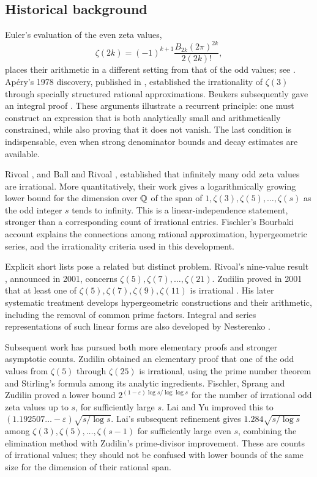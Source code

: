 \subsection{Historical background}
Euler's evaluation of the even zeta values,
\[
 \zeta(2k)=(-1)^{k+1}\frac{B_{2k}(2\pi)^{2k}}{2(2k)!},
\]
places their arithmetic in a different setting from that of the odd values;
see \cite[\S25.6]{DLMF}. Ap\'ery's 1978 discovery, published in
\cite{Apery}, established the irrationality of $\zeta(3)$ through specially
structured rational approximations. Beukers subsequently gave an integral
proof \cite{Beukers}. These arguments illustrate a recurrent principle:
one must construct an expression that is both analytically small and
arithmetically constrained, while also proving that it does not vanish.
The last condition is indispensable, even when strong denominator bounds
and decay estimates are available.

Rivoal \cite{Rivoal00}, and Ball and Rivoal \cite{BR}, established that
infinitely many odd zeta values are irrational. More quantitatively, their
work gives a logarithmically growing lower bound for the dimension over
$\mathbb Q$ of the span of $1,\zeta(3),\zeta(5),\ldots,\zeta(s)$ as the odd
integer $s$ tends to infinity. This is a linear-independence statement,
stronger than a corresponding count of irrational entries. Fischler's
Bourbaki account \cite{Fischler04} explains the connections among rational
approximation, hypergeometric series, and the irrationality criteria used
in this development.

Explicit short lists pose a related but distinct problem. Rivoal's
nine-value result \cite{Rivoal02}, announced in 2001, concerns
$\zeta(5),\zeta(7),\ldots,\zeta(21)$. Zudilin proved in 2001 that at least
one of $\zeta(5),\zeta(7),\zeta(9),\zeta(11)$ is irrational
\cite{Zudilin01}. His later systematic treatment \cite{Zudilin04} develops
hypergeometric constructions and their arithmetic, including the removal
of common prime factors. Integral and series representations of such
linear forms are also developed by Nesterenko \cite{Nesterenko03}.

Subsequent work has pursued both more elementary proofs and stronger
asymptotic counts. Zudilin \cite{Zudilin18} obtained an elementary proof
that one of the odd values from $\zeta(5)$ through $\zeta(25)$ is irrational,
using the prime number theorem and Stirling's formula among its analytic
ingredients. Fischler, Sprang and Zudilin \cite{FSZ} proved a lower bound
$2^{(1-\varepsilon)\log s/\log\log s}$ for the number of irrational odd
zeta values up to $s$, for sufficiently large $s$. Lai and Yu \cite{LY}
improved this to $(1.192507\ldots-\varepsilon)\sqrt{s/\log s}$.
Lai's subsequent refinement \cite{Lai26} gives
$1.284\sqrt{s/\log s}$ among $\zeta(3),\zeta(5),\ldots,\zeta(s-1)$ for
sufficiently large even $s$, combining the elimination method with
Zudilin's prime-divisor improvement. These are counts of irrational
values; they should not be confused with lower bounds of the same size
for the dimension of their rational span.

